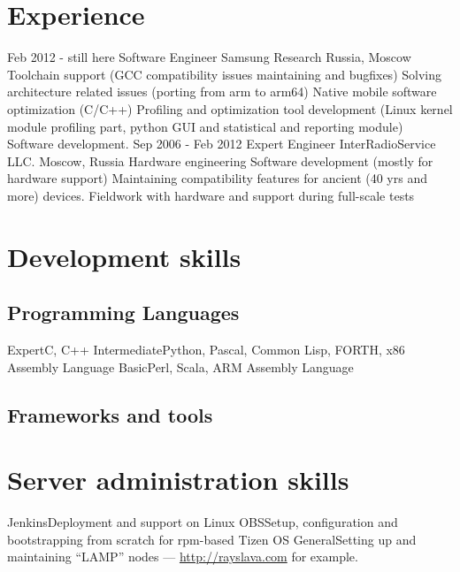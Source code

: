 \documentclass[11pt,a4paper]{moderncv}
\begin{document}
\section{Experience}
\cventry
  {Feb 2012 - still here}
  {Software Engineer}
  {Samsung Research Russia, Moscow}
  {}{}
  {Toolchain support (GCC compatibility issues maintaining and bugfixes)\newline{}
Solving architecture related issues (porting from arm to arm64)\newline{}
Native mobile software optimization (C/C++)\newline{}
Profiling and optimization tool development (Linux kernel module profiling part, python GUI and statistical and reporting module)\newline{}
Software development.}
\cventry
  {Sep 2006 - Feb 2012}
  {Expert Engineer}
  {InterRadioService LLC. Moscow, Russia}
  {}{}
  {Hardware engineering\newline{}
Software development (mostly for hardware support)\newline{}
Maintaining compatibility features for ancient (40 yrs and more) devices.\newline{}
Fieldwork with hardware and support during full-scale tests\newline{}}

\section{Development skills}
\subsection{Programming Languages}
\cvitem
  {Expert}{C, C++}
\cvitem
  {Intermediate}{Python, Pascal, Common Lisp, FORTH, x86 Assembly Language}
\cvitem
  {Basic}{Perl, Scala, ARM Assembly Language}
\subsection{Frameworks and tools}

\section{Server administration skills}
\cvitem
  {Jenkins}{Deployment and support on Linux}
\cvitem
  {OBS}{Setup, configuration and bootstrapping from scratch for rpm-based Tizen OS}
\cvitem
  {General}{Setting up and maintaining ``LAMP'' nodes — \url{http://rayslava.com} for example.}
\end{document}
